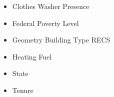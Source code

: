 \begin{itemize}
\item Clothes Washer Presence
\item Federal Poverty Level
\item Geometry Building Type RECS
\item Heating Fuel
\item State
\item Tenure
\end{itemize}
